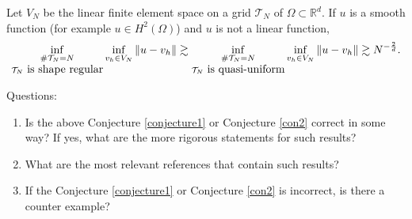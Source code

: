 \begin{conjecture}\label{con2}
Let %
 $V_N$ be the linear finite element space on a grid $\mathcal  T_N$ of $\Omega\subset \mathbb R^d$. 
If $u$ is a smooth function (for example $u\in H^2(\Omega)$) and $u$ is not a linear function,
\begin{equation}\label{lower_convergence_0_3}
\mathop{\inf_{\# \mathcal T_N=N}}_{\mathcal T_N~\hbox{is shape regular}} \inf_{v_h\in V_N}\|u-v_h\|\gtrsim \mathop{\inf_{\# \mathcal T_N=N}}_{\mathcal T_N~\hbox{is quasi-uniform}} \inf_{v_h\in V_N}\|u-v_h\|\gtrsim N^{-\frac{2}{d}}.
\end{equation}
\end{conjecture}
Questions:
\begin{enumerate}
	\item Is the above Conjecture \ref{conjecture1} or Conjecture \ref{con2} correct in some way?  If yes, what are
	the more rigorous statements for such results?
	\item What are the most relevant references that contain such results?
	\item If the Conjecture \ref{conjecture1} or Conjecture \ref{con2} is incorrect, is there a counter example?
\end{enumerate}


